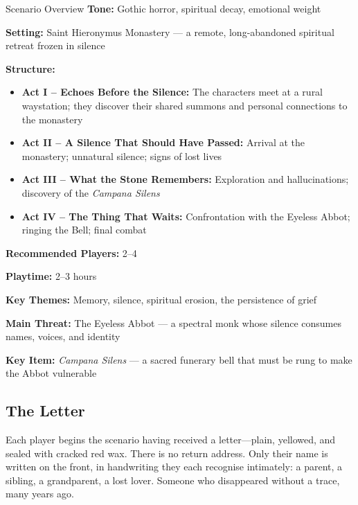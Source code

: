 \documentclass[nodeprecatedcode,bg=print]{dndbook/dndbook}
\begin{document}
\begin{WyrdSidebar}[float=!b]{Scenario Overview}
    \textbf{Tone:} Gothic horror, spiritual decay, emotional weight
    
    \noindent
    \textbf{Setting:} Saint Hieronymus Monastery — a remote, long-abandoned spiritual retreat frozen in silence
    
    \noindent
    \textbf{Structure:}
    \begin{itemize}
        \item \textbf{Act I – Echoes Before the Silence:} The characters meet at a rural waystation; they discover their shared summons and personal connections to the monastery
        \item \textbf{Act II – A Silence That Should Have Passed:} Arrival at the monastery; unnatural silence; signs of lost lives
        \item \textbf{Act III – What the Stone Remembers:} Exploration and hallucinations; discovery of the \emph{Campana Silens}
        \item \textbf{Act IV – The Thing That Waits:} Confrontation with the Eyeless Abbot; ringing the Bell; final combat
    \end{itemize}
    
    \noindent
    \textbf{Recommended Players:} 2–4
    
    \noindent
    \textbf{Playtime:} 2–3 hours
    
    \noindent
    \textbf{Key Themes:} Memory, silence, spiritual erosion, the persistence of grief
    
    \noindent
    \textbf{Main Threat:} The Eyeless Abbot — a spectral monk whose silence consumes names, voices, and identity
    
    \noindent
    \textbf{Key Item:} \emph{Campana Silens} — a sacred funerary bell that must be rung to make the Abbot vulnerable
\end{WyrdSidebar}
    

\subsection*{The Letter}

Each player begins the scenario having received a letter—plain, yellowed, and sealed with cracked red wax. There is no return address. Only their name is written on the front, in handwriting they each recognise intimately: a parent, a sibling, a grandparent, a lost lover. Someone who disappeared without a trace, many years ago.
\end{document}
